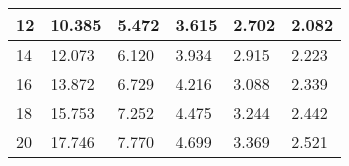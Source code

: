 \begin{table}[t!]
\begin{tabular}{|p{1.00cm}|p{0.95cm}|p{0.95cm}|p{0.95cm}|p{0.95cm}|p{0.95cm}|}
		12               & 10.385                                                                   & 5.472                                                                    & 3.615                                                                     & 2.702                                                                     & 2.082                                                                     \\ \hline
		14               & 12.073                                                                   & 6.120                                                                    & 3.934                                                                     & 2.915                                                                     & 2.223                                                                     \\ \hline
		16               & 13.872                                                                   & 6.729                                                                    & 4.216                                                                     & 3.088                                                                     & 2.339                                                                     \\ \hline
		18               & 15.753                                                                   & 7.252                                                                    & 4.475                                                                     & 3.244                                                                     & 2.442                                                                     \\ \hline
		20               & 17.746                                                                   & 7.770                                                                    & 4.699                                                                     & 3.369                                                                     & 2.521                                                                     \\ \hline
	\end{tabular}
	\label{tab:coverage}
\end{table}
